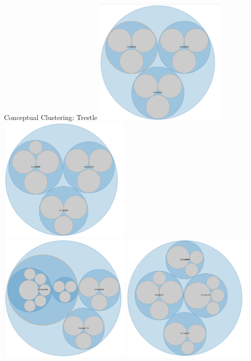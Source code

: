 \documentclass[rgb]{beamer}
\begin{document}
        \begin{frame}{Conceptual Clustering: Trestle}
           \centering  \includegraphics[keepaspectratio,width=0.48\textwidth, height=0.48\textheight]{graphics/results_trestle/trestle_0.png} \hspace{2cm}
             \includegraphics[keepaspectratio,width=0.48\textwidth, height=0.48\textheight]{graphics/results_trestle/trestle_10.png} \\
            \includegraphics[keepaspectratio,width=0.48\textwidth, height=0.48\textheight]{graphics/results_trestle/trestle_33.png} \hspace{2cm}
           \includegraphics[keepaspectratio,width=0.48\textwidth, height=0.48\textheight]{graphics/results_trestle/trestle_50.png}
        \end{frame}{}
        
\end{document}
